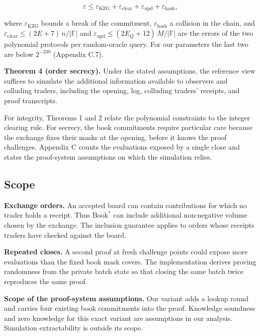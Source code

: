 \[\varepsilon \le \varepsilon_{\mathrm{KZG}} + \varepsilon_{\mathrm{clear}} + \varepsilon_{\mathrm{upd}} + \varepsilon_{\mathrm{hash}},\]

where \(\varepsilon_{\mathrm{KZG}}\) bounds a break of the commitment, \(\varepsilon_{\mathrm{hash}}\) a collision in the chain, and \(\varepsilon_{\mathrm{clear}} \le (2E + 7)\,n/|\mathbb{F}|\) and \(\varepsilon_{\mathrm{upd}} \le (2E_Q + 12)\,M/|\mathbb{F}|\) are the errors of the two polynomial protocols per random-oracle query. For our parameters the last two are below \(2^{-230}\) (Appendix C.7).

\textbf{Theorem 4 (order secrecy).} Under the stated assumptions, the reference view suffices to simulate the additional information available to observers and colluding traders, including the opening, log, colluding traders' receipts, and proof transcripts.

For integrity, Theorems 1 and 2 relate the polynomial constraints to the integer clearing rule. For secrecy, the book commitments require particular care because the exchange fixes their masks at the opening, before it knows the proof challenges. Appendix C counts the evaluations exposed by a single close and states the proof-system assumptions on which the simulation relies.

\subsection{Scope}

\textbf{Exchange orders.} An accepted board can contain contributions for which no trader holds a receipt. Thus \(\text{Book}^*\) can include additional non-negative volume chosen by the exchange. The inclusion guarantee applies to orders whose receipts traders have checked against the board.

\textbf{Repeated closes.} A second proof at fresh challenge points could expose more evaluations than the fixed book mask covers. The implementation derives proving randomness from the private batch state so that closing the same batch twice reproduces the same proof.

\textbf{Scope of the proof-system assumptions.} Our variant adds a lookup round and carries four existing book commitments into the proof. Knowledge soundness and zero knowledge for this exact variant are assumptions in our analysis. Simulation extractability is outside its scope.



